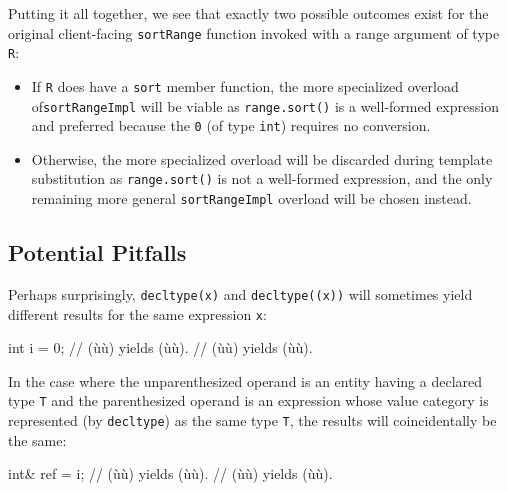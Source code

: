 \noindent Putting it all together, we see that exactly two possible
outcomes exist for the original client-facing \lstinline!sortRange! function
invoked with a range argument of type \lstinline!R!:

\begin{itemize}
\item{If \lstinline!R! does have a \lstinline!sort! member function, the more specialized overload of\linebreak[4] \lstinline!sortRangeImpl! will be viable as \lstinline!range.sort()! is a well-formed expression and preferred because the  \lstinline!0! (of type \lstinline!int!) requires no conversion.}
\item{Otherwise, the more specialized overload will be discarded during template substitution as \lstinline!range.sort()! is not a well-formed expression, and the only remaining more general \lstinline!sortRangeImpl! overload will be chosen instead.}
\end{itemize}

\subsection[Potential Pitfalls]{Potential Pitfalls}\label{potential-pitfalls}

Perhaps surprisingly, \lstinline!decltype(x)! and \lstinline!decltype((x))!
will sometimes yield different results for the same expression
\lstinline!x!:

\begin{emcppslisting}[emcppsbatch=e10]
int i = 0; // (ù{}ù) yields (ù{}ù).
           // (ù{}ù) yields (ù{}ù).
\end{emcppslisting}

\noindent In the case where the unparenthesized operand is an entity having a
declared type \lstinline!T! and the parenthesized operand is an expression
whose value category is represented (by \lstinline!decltype!) as the same
type \lstinline!T!, the results will coincidentally be the same:

\begin{emcppslisting}[emcppsbatch=e10]
int& ref = i;  // (ù{}ù) yields (ù{}ù).
               // (ù{}ù) yields (ù{}ù).
\end{emcppslisting}

